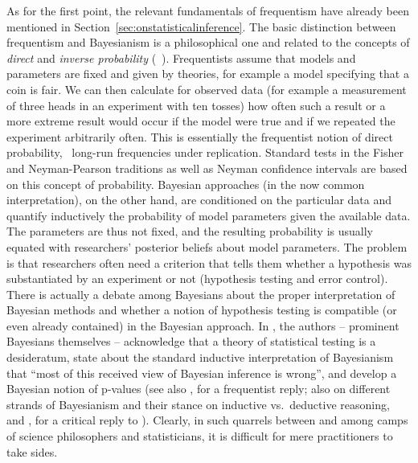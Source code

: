 As for the first point, the relevant fundamentals of frequentism have already been mentioned in Section~\ref{sec:onstatisticalinference}.
The basic distinction between frequentism and Bayesianism is a philosophical one and related to the concepts of \textit{direct} and \textit{inverse probability} (\eeg\ \citealt{Senn2011}).
Frequentists assume that models and parameters are fixed and given by theories, for example a model specifying that a coin is fair.
We can then calculate for observed data (for example a measurement of three heads in an experiment with ten tosses) how often such a result or a more extreme result would occur if the model were true and if we repeated the experiment arbitrarily often.
This is essentially the frequentist notion of direct probability, \ie\ long-run frequencies under replication.
Standard tests in the Fisher and Neyman-Pearson traditions as well as Neyman confidence intervals are based on this concept of probability.
Bayesian approaches (in the now common interpretation), on the other hand, are conditioned on the particular data and quantify inductively the probability of model parameters given the available data.
The parameters are thus not fixed, and the resulting probability is usually equated with researchers' posterior beliefs about model parameters.
The problem is that researchers often need a criterion that tells them whether a hypothesis was substantiated by an experiment or not (hypothesis testing and error control).
There is actually a debate among Bayesians about the proper interpretation of Bayesian methods and whether a notion of hypothesis testing is compatible (or even already contained) in the Bayesian approach.
In \citet[10]{GelmanShalizi2013}, the authors -- prominent Bayesians themselves -- acknowledge that a theory of statistical testing is a desideratum, state about the standard inductive interpretation of Bayesianism that ``most of this received view of Bayesian inference is wrong'', and develop a Bayesian notion of p-values (see also \citealt{Mayo2013}, for a frequentist reply; also \citealt{Senn2011} on different strands of Bayesianism and their stance on inductive vs.\ deductive reasoning, and \citealt{Mayo2011}, for a critical reply to \citealt{Senn2011}).
Clearly, in such quarrels between and among camps of science philosophers and statisticians, it is difficult for mere practitioners to take sides.

